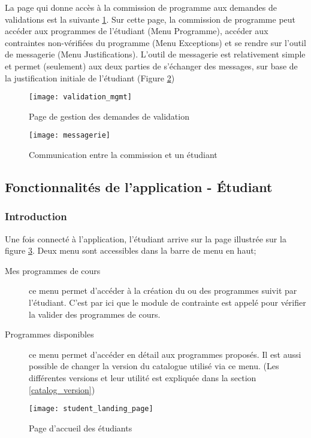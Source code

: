 La page qui donne accès à la commission de programme aux demandes de validations est la suivante \ref{fig:validation_mgmt}. Sur cette page, la commission de programme peut accéder aux programmes de l'étudiant (Menu Programme), accéder aux contraintes non-vérifiées du programme (Menu Exceptions) et se rendre sur l'outil de messagerie (Menu Justifications). L'outil de messagerie est relativement simple et permet (seulement) aux deux parties de s'échanger des messages, sur base de la justification initiale de l'étudiant (Figure \ref{fig:messenger})



\begin{figure}
\centering
\caption{Page de gestion des demandes de validation}
\label{fig:validation_mgmt}
\texttt{[image: validation\_mgmt]}
\end{figure}

\begin{figure}
\centering
\caption{Communication entre la commission et un étudiant}
\label{fig:messenger}
\texttt{[image: messagerie]}
\end{figure}

\clearpage
\subsection{Fonctionnalités de l'application - Étudiant}
\subsubsection{Introduction}
Une fois connecté à l'application, l'étudiant arrive sur la page illustrée sur la figure \ref{fig:student_landing_page}. Deux menu sont accessibles dans la barre de menu en haut; 

\begin{description}
  \item[Mes programmes de cours] ce menu permet d'accéder à la création du ou des programmes suivit par l'étudiant. C'est par ici que le module de contrainte est appelé pour vérifier la valider des programmes de cours. 
  \item[Programmes disponibles] ce menu permet d'accéder en détail aux programmes proposés. Il est aussi possible de changer la version du catalogue utilisé via ce menu. (Les différentes versions et leur utilité est expliquée dans la section \ref{catalog_version})
\end{description}
\begin{figure}
\centering
\caption{Page d’accueil des étudiants}
\label{fig:student_landing_page}
\texttt{[image: student\_landing\_page]}
\end{figure}

